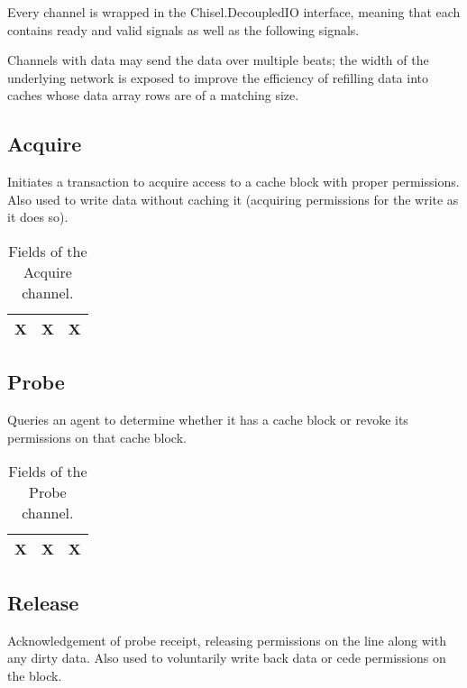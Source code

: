 Every channel is wrapped in the Chisel.DecoupledIO interface, meaning that each contains ready and valid signals as well as the following signals.

Channels with data may send the data over multiple beats; the width of the underlying network is exposed to improve the efficiency of refilling data into caches whose data array rows are of a matching size.

\subsection{Acquire}

Initiates a transaction to acquire access to a cache block with proper permissions.
Also used to write data without caching it (acquiring permissions for the write as it does so).

\begin{table}[ht]
\begin{center}
\begin{tabular}{|l|l|l|}
    \hline
    X&X&X\\
    \hline
\end{tabular}
\end{center}
\caption{Fields of the Acquire channel.}
\label{tab:acquire}
\end{table}

\subsection{Probe}

Queries an agent to determine whether it has a cache block or revoke its permissions on that cache block.

\begin{table}[ht]
\begin{center}
\begin{tabular}{|l|l|l|}
    \hline
    X&X&X\\
    \hline
\end{tabular}
\end{center}
\caption{Fields of the Probe channel.}
\label{tab:probe}
\end{table}


\subsection{Release}

Acknowledgement of probe receipt, releasing permissions on the line along with any dirty data.
Also used to voluntarily write back data or cede permissions on the block.


